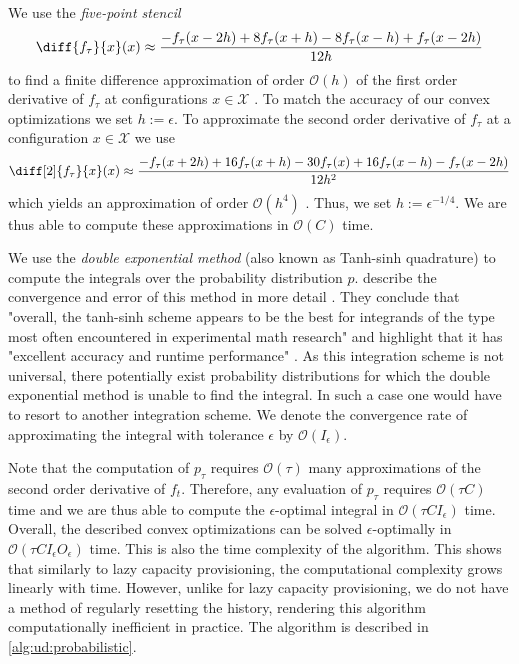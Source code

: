 We use the \textit{five-point stencil} \begin{align*}
    \diff{f_{\tau}}{x}(x) \approx \frac{-f_{\tau}(x - 2h) + 8 f_{\tau}(x + h) - 8 f_{\tau}(x - h) + f_{\tau}(x - 2h)}{12h}
\end{align*} to find a finite difference approximation of order $\mathcal{O}(h)$ of the first order derivative of $f_{\tau}$ at configurations $x \in \mathcal{X}$ \cite{Sauer2011}. To match the accuracy of our convex optimizations we set $h := \epsilon$. To approximate the second order derivative of $f_{\tau}$ at a configuration $x \in \mathcal{X}$ we use \begin{align*}
    \diff[2]{f_{\tau}}{x}(x) \approx \frac{-f_{\tau}(x + 2h) + 16 f_{\tau}(x+h) - 30 f_{\tau}(x) + 16 f_{\tau}(x-h) - f_{\tau}(x - 2h)}{12 h^2}
\end{align*} which yields an approximation of order $\mathcal{O}(h^4)$ \cite{Sauer2011}. Thus, we set $h := \epsilon^{-1/4}$. We are thus able to compute these approximations in $\mathcal{O}(C)$ time.

We use the \textit{double exponential method} (also known as Tanh-sinh quadrature) to compute the integrals over the probability distribution $p$. \citeauthor*{Bailey2005} describe the convergence and error of this method in more detail \cite{Bailey2005}. They conclude that "overall, the tanh-sinh scheme appears to be the best
for integrands of the type most often encountered in experimental math research" and highlight that it has "excellent accuracy and runtime performance" \cite{Bailey2005}. As this integration scheme is not universal, there potentially exist probability distributions for which the double exponential method is unable to find the integral. In such a case one would have to resort to another integration scheme. We denote the convergence rate of approximating the integral with tolerance $\epsilon$ by $\mathcal{O}(I_{\epsilon})$.

Note that the computation of $p_{\tau}$ requires $\mathcal{O}(\tau)$ many approximations of the second order derivative of $f_{t}$. Therefore, any evaluation of $p_{\tau}$ requires $\mathcal{O}(\tau C)$ time and we are thus able to compute the $\epsilon$-optimal integral in $\mathcal{O}(\tau C I_{\epsilon})$ time. Overall, the described convex optimizations can be solved $\epsilon$-optimally in $\mathcal{O}(\tau C I_{\epsilon} O_{\epsilon})$ time. This is also the time complexity of the algorithm. This shows that similarly to lazy capacity provisioning, the computational complexity grows linearly with time. However, unlike for lazy capacity provisioning, we do not have a method of regularly resetting the history, rendering this algorithm computationally inefficient in practice. The algorithm is described in \autoref{alg:ud:probabilistic}.

